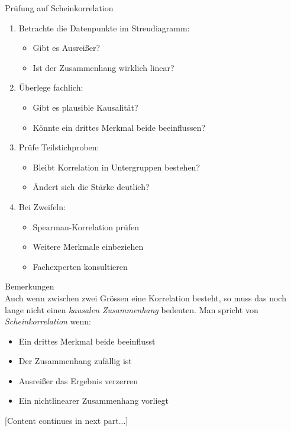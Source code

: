 \begin{KR}{Prüfung auf Scheinkorrelation}
\begin{enumerate}
    \item Betrachte die Datenpunkte im Streudiagramm:
        \begin{itemize}
            \item Gibt es Ausreißer?
            \item Ist der Zusammenhang wirklich linear?
        \end{itemize}
    \item Überlege fachlich:
        \begin{itemize}
            \item Gibt es plausible Kausalität?
            \item Könnte ein drittes Merkmal beide beeinflussen?
        \end{itemize}
    \item Prüfe Teilstichproben:
        \begin{itemize}
            \item Bleibt Korrelation in Untergruppen bestehen?
            \item Ändert sich die Stärke deutlich?
        \end{itemize}
    \item Bei Zweifeln:
        \begin{itemize}
            \item Spearman-Korrelation prüfen
            \item Weitere Merkmale einbeziehen
            \item Fachexperten konsultieren
        \end{itemize}
\end{enumerate}
\end{KR}

\begin{remark}{Bemerkungen}\\
Auch wenn zwischen zwei Grössen eine Korrelation besteht, so muss das noch lange nicht einen \emph{kausalen Zusammenhang} bedeuten. Man spricht von \emph{Scheinkorrelation} wenn:
\begin{itemize}
    \item Ein drittes Merkmal beide beeinflusst
    \item Der Zusammenhang zufällig ist
    \item Ausreißer das Ergebnis verzerren
    \item Ein nichtlinearer Zusammenhang vorliegt
\end{itemize}
\end{remark}

[Content continues in next part...]